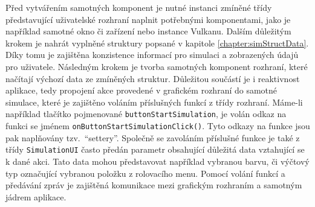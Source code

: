 Před vytvářením samotných komponent je nutné instanci zmíněné třídy představující uživatelské rozhraní naplnit potřebnými komponentami, jako je například samotné okno či zařízení nebo instance Vulkanu. Dalším důležitým krokem je nahrát vyplněné struktury popsané v kapitole \ref{chapter:simStructData}. Díky tomu je zajištěna konzistence informací pro simulaci a zobrazených údajů pro uživatele. Následným krokem je tvorba samotných komponent rozhraní, které načítají výchozí data ze zmíněných struktur. Důležitou součástí je i reaktivnost aplikace, tedy propojení akce provedené v grafickém rozhraní do samotné simulace, které je zajištěno voláním příslušných funkcí z třídy rozhraní. Máme-li například tlačítko pojmenované \texttt{buttonStartSimulation}, je volán odkaz na funkci se jménem \texttt{onButtonStartSimulationClick()}. Tyto odkazy na funkce jsou pak naplňovány tzv.~\enquote{settery}. Společně se zavoláním příslušné funkce je také z třídy \texttt{SimulationUI} často předán parametr obsahující důležitá data vztahující se k dané akci. Tato data mohou představovat například vybranou barvu, či výčtový typ označující vybranou položku z rolovacího menu. Pomocí volání funkcí a předávání zpráv je zajištěná komunikace mezi grafickým rozhraním a samotným jádrem aplikace.

